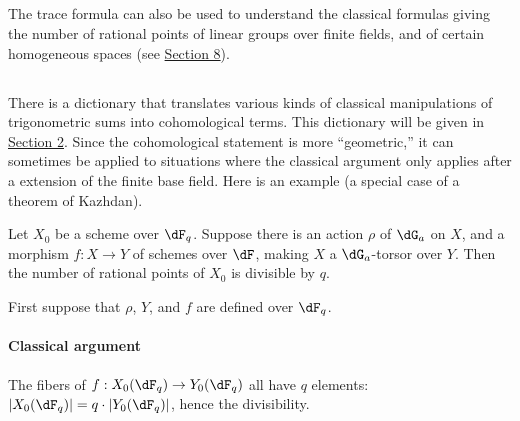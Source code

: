 \documentclass[oneside]{book}
\begin{document}
\subsection{}\label{VI:1-11}

The trace formula can also be used to understand the classical formulas 
giving the number of rational points of linear groups over 
finite fields, and of certain homogeneous spaces (see \hyperref[VI:8]{Section 8}). 





\subsection{}\label{VI:1-12}

There is a dictionary that translates various kinds of classical 
manipulations of trigonometric sums into cohomological terms. This dictionary 
will be given in \hyperref[VI:2]{Section 2}. Since the cohomological statement is more 
``geometric,'' it can sometimes be applied 
to situations where the classical argument only applies after a 
extension of the finite base field. Here is an example (a special case of a 
theorem of Kazhdan).

\begin{theorem_}[Kazhdan]\label{VI:1-13}
Let $X_0$ be a scheme over $\dF_q$. Suppose there is an action $\rho$ of 
$\dG_a$ on $X$, and a morphism $f:X\to Y$ of schemes over $\dF$, making 
$X$ a $\dG_a$-torsor over $Y$. Then the number of rational points of $X_0$ 
is divisible by $q$.
\end{theorem_}

First suppose that $\rho$, $Y$, and $f$ are defined over $\dF_q$. 


\paragraph{Classical argument}
The fibers of $f:X_0(\dF_q)\to Y_0(\dF_q)$ all have $q$ elements: 
$|X_0(\dF_q)| = q\cdot |Y_0(\dF_q)|$, hence the divisibility. 
\end{document}
